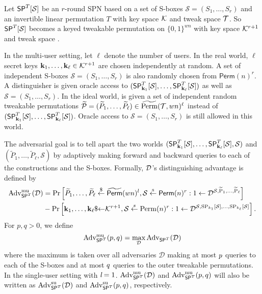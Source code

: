\arrangespace

{}
%
Let $\mathsf{SP}^T[\mathcal{S}]$ be an $r$-round SPN based on a set of S-boxes $\mathcal{S}=(S_1, \ldots  ,S_r)$ and an invertible linear permutation $T$ with key space $\mathcal{K}$ and tweak space $\mathcal{T}$. So $\mathsf{SP}^T[\mathcal{S}]$
becomes a keyed tweakable permutation on $\{0, 1\}^{wn}$ with key space $\mathcal{K}^{r+1}$ and tweak space \calT.


In the multi-user setting, let $\ell$ denote the number of users. In the real
world, $\ell$ secret keys $\mathbf{k}_1,\ldots,\mathbf{k}_\ell\in\mathcal{K}^{r+1}$ are chosen independently at random.
A set of independent S-boxes $\mathcal{S}=(S_1,\ldots,S_r)$ is also randomly chosen from $\textsf{Perm}(n)^r$. A distinguisher \dis is given oracle access to $(\mathsf{SP}_{\mathbf{k}_1}^T[\mathcal{S}],\ldots,\mathsf{SP}_{\mathbf{k}_\ell}^T[\mathcal{S}])$ as
well as $\mathcal{S}=(S_1,\ldots,S_r)$. In the ideal world, \dis is given a set of independent
random tweakable permutations $\widetilde{\mathcal{P}}=(\widetilde{P}_1,\ldots,\widetilde{P}_{\ell})\in\widetilde{\operatorname{Perm}}(\mathcal{T},wn)^\ell$ instead of $(\mathsf{SP}_{\mathbf{k}_1}^T[\mathcal{S}],\ldots,\mathsf{SP}_{\mathbf{k}_\ell}^T[\mathcal{S}])$. Oracle access to $\mathcal{S}=(S_1,\ldots,S_r)$ is still allowed in this world.


The adversarial goal is to tell apart the two worlds $(\mathsf{SP}_{\mathbf{k}_1}^T[\mathcal{S}],\ldots,\mathsf{SP}_{\mathbf{k}_\ell}^T[\mathcal{S}],\mathcal{S})$ and $(\widetilde{P}_1,\ldots,\widetilde{P}_{\ell},\mathcal{S})$ by adaptively making forward and backward queries to each
of the constructions and the S-boxes. Formally, $\mathcal{D}$'s distinguishing advantage is
defined by
%
$$
\begin{aligned}
\operatorname{Adv}_{\mathsf{SP}^T}^{\mathrm{mu}}(\mathcal{D}) &=\operatorname{Pr}\left[\widetilde{P}_1,\ldots,\widetilde{P}_{\ell} \stackrel{\$}{\leftarrow} \widetilde{\mathsf{Perm}}(w n)^l, \mathcal{S} \stackrel{\mathrm{s}}{\leftarrow} \mathsf{Perm}(n)^{r}: 1 \leftarrow \mathcal{D}^{\mathcal{S}, \widetilde{\operatorname{P}}_{1}, \ldots, \widetilde{\operatorname{P}}_{\ell}}\right] \\
&-\operatorname{Pr}\left[\mathbf{k}_{1}, \ldots, \mathbf{k}_{\ell} \${\leftarrow} \mathcal{K}^{r+1}, \mathcal{S} \stackrel{s}{\leftarrow} \operatorname{Perm}(n)^{r}: 1 \leftarrow \mathcal{D}^{\mathcal{S}, \operatorname{SP}_{k_{1}}[\mathcal{S}], \ldots, \operatorname{SP}_{k_{\ell}}[\mathcal{S}]}\right].
\end{aligned}
$$
%
For $p,q > 0$, we define
%
$$
\operatorname{Adv}^{\mathrm{mu}}_{\mathsf{SP}^T}(p, q) = \max _{\mathcal{D}} \operatorname{Adv}_{\mathsf{SP}^T}(\mathcal{D})
$$
%
where the maximum is taken over all adversaries $\mathcal{D}$ making at most $\mathnormal{p}$ queries to each of the S-boxes and at most $\mathnormal{q}$ queries to the outer tweakable permutations. In the single-user setting with $\emph{l} = 1$. $\operatorname{Adv}^{\mathrm{mu}}_{\mathsf{SP}^T}(\mathcal{D})$ and $\operatorname{Adv}^{\mathrm{mu}}_{\mathsf{SP}^T}(p, q)$  will also be written as $\operatorname{Adv}^{\mathrm{su}}_{\mathsf{SP}^T}(\mathcal{D})$ and $\operatorname{Adv}^{\mathrm{su}}_{\mathsf{SP}^T}(p, q)$, respectively.



